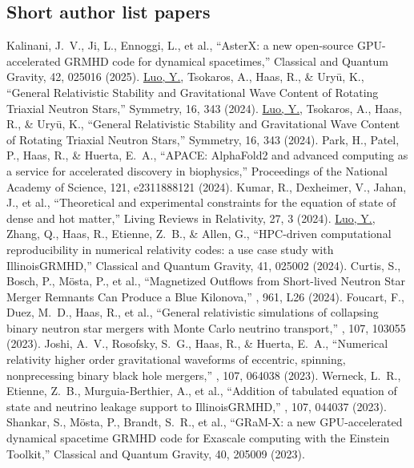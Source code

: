 \subsection{Short author list papers}
 Kalinani, J.~V., Ji, L., Ennoggi, L., et al., ``AsterX: a new open-source GPU-accelerated GRMHD code for dynamical spacetimes,'' Classical and Quantum Gravity, 42, 025016 (2025).
 \underline{Luo, Y.}, Tsokaros, A., Haas, R., \& Ury{\={u}}, K., ``General Relativistic Stability and Gravitational Wave Content of Rotating Triaxial Neutron Stars,'' Symmetry, 16, 343 (2024).
 \underline{Luo, Y.}, Tsokaros, A., Haas, R., \& Ury{\={u}}, K., ``General Relativistic Stability and Gravitational Wave Content of Rotating Triaxial Neutron Stars,'' Symmetry, 16, 343 (2024).
 Park, H., Patel, P., Haas, R., \& Huerta, E.~A., ``APACE: AlphaFold2 and advanced computing as a service for accelerated discovery in biophysics,'' Proceedings of the National Academy of Science, 121, e2311888121 (2024).
 Kumar, R., Dexheimer, V., Jahan, J., et al., ``Theoretical and experimental constraints for the equation of state of dense and hot matter,'' Living Reviews in Relativity, 27, 3 (2024).
 \underline{Luo, Y.}, Zhang, Q., Haas, R., Etienne, Z.~B., \& Allen, G., ``HPC-driven computational reproducibility in numerical relativity codes: a use case study with IllinoisGRMHD,'' Classical and Quantum Gravity, 41, 025002 (2024).
 Curtis, S., Bosch, P., M{\"o}sta, P., et al., ``Magnetized Outflows from Short-lived Neutron Star Merger Remnants Can Produce a Blue Kilonova,'' \apjl, 961, L26 (2024).
 Foucart, F., Duez, M.~D., Haas, R., et al., ``General relativistic simulations of collapsing binary neutron star mergers with Monte Carlo neutrino transport,'' \prd, 107, 103055 (2023).
 Joshi, A.~V., Rosofsky, S.~G., Haas, R., \& Huerta, E.~A., ``Numerical relativity higher order gravitational waveforms of eccentric, spinning, nonprecessing binary black hole mergers,'' \prd, 107, 064038 (2023).
 Werneck, L.~R., Etienne, Z.~B., Murguia-Berthier, A., et al., ``Addition of tabulated equation of state and neutrino leakage support to IllinoisGRMHD,'' \prd, 107, 044037 (2023).
 Shankar, S., M{\"o}sta, P., Brandt, S.~R., et al., ``GRaM-X: a new GPU-accelerated dynamical spacetime GRMHD code for Exascale computing with the Einstein Toolkit,'' Classical and Quantum Gravity, 40, 205009 (2023).

